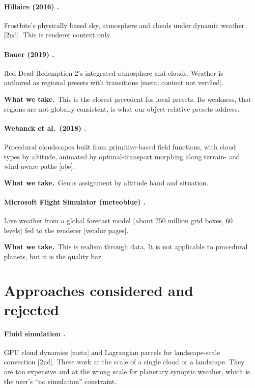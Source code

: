 \documentclass[11pt,a4paper]{article}
\newcommand{\verif}[1]{\textsf{\small[#1]}}
\newcommand{\takes}{\par\noindent\textbf{What we take.}\ }
\begin{document}
\paragraph{Hillaire (2016) \cite{hillaire2016}.}
Frostbite's physically based sky, atmosphere and clouds under dynamic weather
\verif{2nd}. This is renderer context only.

\paragraph{Bauer (2019) \cite{bauer2019}.}
Red Dead Redemption 2's integrated atmosphere and clouds. Weather is authored as regional
presets with transitions \verif{meta; content not verified}.
\takes This is the closest precedent for local presets. Its weakness, that regions are not
globally consistent, is what our object-relative presets address.

\paragraph{Webanck et al.\ (2018) \cite{webanck2018}.}
Procedural cloudscapes built from primitive-based field functions, with cloud types by
altitude, animated by optimal-transport morphing along terrain- and wind-aware paths
\verif{abs}.
\takes Genus assignment by altitude band and situation.

\paragraph{Microsoft Flight Simulator (meteoblue) \cite{meteoblue_msfs}.}
Live weather from a global forecast model (about 250 million grid boxes, 60 levels) fed to
the renderer \verif{vendor pages}.
\takes This is realism through data. It is not applicable to procedural planets, but it is
the quality bar.

\section{Approaches considered and rejected}

\paragraph{Fluid simulation \cite{harris2003,goswami2017}.}
GPU cloud dynamics \verif{meta} and Lagrangian parcels for landscape-scale convection
\verif{2nd}. These work at the scale of a single cloud or a landscape. They are too
expensive and at the wrong scale for planetary synoptic weather, which is the user's
``no simulation'' constraint.
\end{document}
